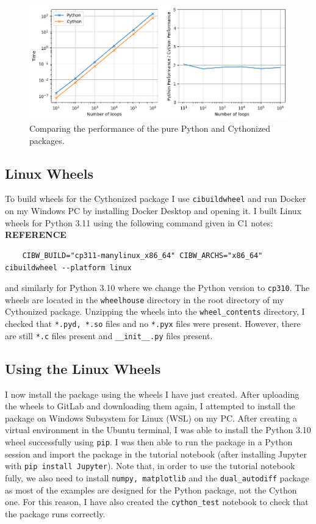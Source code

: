 \documentclass{article}
\begin{document}
\begin{figure}
    \centering
    \includegraphics[width=1\linewidth]{q9_timeit.png}
    \caption{Comparing the performance of the pure Python and Cythonized packages.}
    \label{fig:q9_timeit}
\end{figure}

\subsection{Linux Wheels}
To build wheels for the Cythonized package I use \texttt{cibuildwheel} and run Docker on my Windows PC by installing Docker Desktop and opening it. I built Linux wheels for Python 3.11 using the following command given in C1 notes: \textbf{REFERENCE}
\begin{lstlisting}
    CIBW_BUILD="cp311-manylinux_x86_64" CIBW_ARCHS="x86_64" cibuildwheel --platform linux
\end{lstlisting}
 and similarly for Python 3.10 where we change the Python version to \texttt{cp310}. The wheels are located in the \texttt{wheelhouse} directory in the root directory of my Cythonized package. Unzipping the wheels into the \texttt{wheel\_contents} directory, I checked that \texttt{*.pyd, *.so} files and no \texttt{*.pyx} files were present. However, there are still \texttt{*.c} files present and \texttt{\_\_init\_\_.py} files present.

 \subsection{ Using the Linux Wheels }

I now install the package using the wheels I have just created. After uploading the wheels to GitLab and downloading them again, I attempted to install the package on Windows Subsystem for Linux (WSL) on my PC. After creating a virtual environment in the Ubuntu terminal, I was able to install the Python 3.10 wheel successfully using \texttt{pip}. I was then able to run the package in a Python session and import the package in the tutorial notebook (after installing Jupyter with \texttt{pip install Jupyter}). Note that, in order to use the tutorial notebook fully, we also need to install \texttt{numpy, matplotlib} and the \texttt{dual\_autodiff} package as most of the examples are designed for the Python package, not the Cython one. For this reason, I have also created the \texttt{cython\_test} notebook to check that the package runs correctly. 
\end{document}
